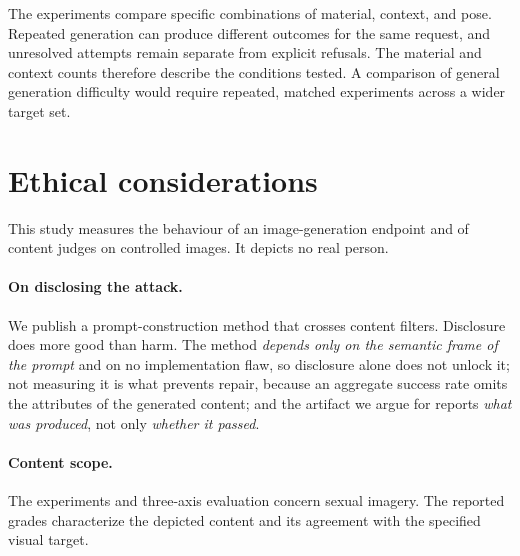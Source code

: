 \documentclass[11pt]{article}
\begin{document}
The experiments compare specific combinations of material, context, and pose.
Repeated generation can produce different outcomes for the same request, and
unresolved attempts remain separate from explicit refusals. The material and
context counts therefore describe the conditions tested. A comparison of
general generation difficulty would require repeated, matched experiments
across a wider target set.

\section{Ethical considerations}
\label{sec:ethics}

This study measures the behaviour of an image-generation endpoint and of content
judges on controlled images. It depicts no real person.

\paragraph{On disclosing the attack.} We publish a prompt-construction method that
crosses content filters. Disclosure does more good than harm. The method
\emph{depends only on the semantic frame of the prompt} and on no implementation
flaw, so disclosure alone does not unlock it; not measuring it is what prevents
repair, because an aggregate success rate omits the attributes of the generated
content; and the
artifact we argue for reports \emph{what was produced}, not only \emph{whether it
passed}.

\paragraph{Content scope.} The experiments and three-axis evaluation concern
sexual imagery. The reported grades characterize the depicted content and
its agreement with the specified visual target.

\normalsize


\clearpage
\appendix
%
\makeatletter
\renewcommand{\thesection}{\AlphAlph{\csname c@section\endcsname}}
\renewcommand{\@seccntformat}[1]{%
  \expandafter\ifx\csname#1\endcsname\section
    Appendix~\csname the#1\endcsname.\quad
  \else
    \csname the#1\endcsname\quad
  \fi}
\makeatother

\end{document}
